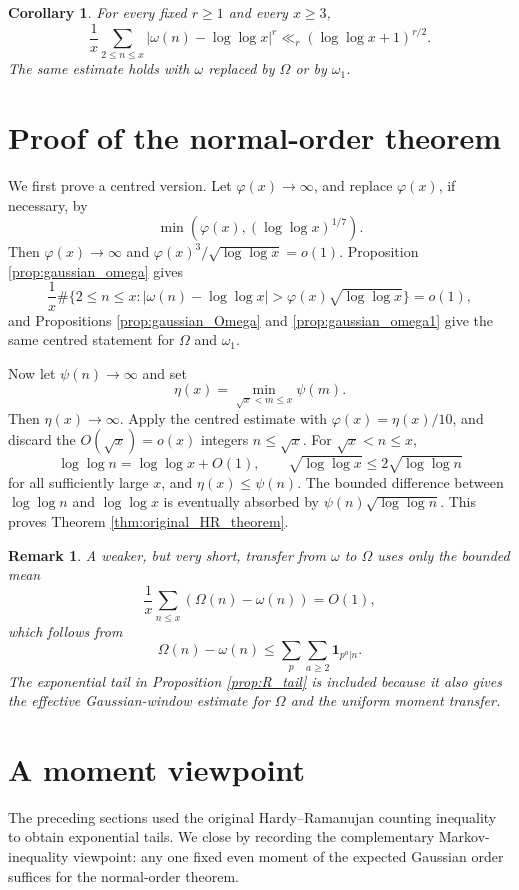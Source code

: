 \documentclass[12pt,a4paper,reqno]{amsart}
\theoremstyle{plain}
\newtheorem{crllry}[thrm]{Corollary}
\newtheorem*{rmk}{Remark}
\numberwithin{sblmm}{thrm}
\numberwithin{equation}{section}
\renewcommand{\phi}{\varphi}
\begin{document}
\begin{crllry}\label{cor:fixed_central_moments}
    For every fixed $r\ge 1$ and every $x\ge 3$,
    \begin{equation}\label{eqn:fixed_central_moments}
        \frac{1}{x}\sum_{2\le n\le x}|\omega(n)-\log\log x|^r\ll_r(\log\log x+1)^{r/2}.
    \end{equation}
    The same estimate holds with $\omega$ replaced by $\Omega$ or by $\omega_1$.
\end{crllry}

\section{Proof of the normal-order theorem}
We first prove a centred version. Let $\phi(x)\to\infty$, and replace $\phi(x)$, if necessary, by
$$\min(\phi(x),(\log\log x)^{1/7}).$$
Then $\phi(x)\to\infty$ and $\phi(x)^3/\sqrt{\log\log x}=o(1)$. Proposition \ref{prop:gaussian_omega} gives
$$\frac{1}{x}\#\{2\le n\le x:|\omega(n)-\log\log x|>\phi(x)\sqrt{\log\log x}\}=o(1),$$
and Propositions \ref{prop:gaussian_Omega} and \ref{prop:gaussian_omega1} give the same centred statement for $\Omega$ and $\omega_1$.

Now let $\psi(n)\to\infty$ and set
$$\eta(x)=\min_{\sqrt{x}<m\le x}\psi(m).$$
Then $\eta(x)\to\infty$. Apply the centred estimate with $\phi(x)=\eta(x)/10$, and discard the $O(\sqrt{x})=o(x)$ integers $n\le\sqrt{x}$. For $\sqrt{x}<n\le x$,
$$\log\log n=\log\log x+O(1),\qquad \sqrt{\log\log x}\le 2\sqrt{\log\log n}$$
for all sufficiently large $x$, and $\eta(x)\le\psi(n)$. The bounded difference between $\log\log n$ and $\log\log x$ is eventually absorbed by $\psi(n)\sqrt{\log\log n}$. This proves Theorem \ref{thm:original_HR_theorem}.

\begin{rmk}
    A weaker, but very short, transfer from $\omega$ to $\Omega$ uses only the bounded mean
    $$\frac{1}{x}\sum_{n\le x}(\Omega(n)-\omega(n))=O(1),$$
    which follows from
    $$\Omega(n)-\omega(n)\le\sum_p\sum_{a\ge 2}\mathbf{1}_{p^a|n}.$$
    The exponential tail in Proposition \ref{prop:R_tail} is included because it also gives the effective Gaussian-window estimate for $\Omega$ and the uniform moment transfer.
\end{rmk}

\section{A moment viewpoint}
The preceding sections used the original Hardy--Ramanujan counting inequality to obtain exponential tails. We close by recording the complementary Markov-inequality viewpoint: any one fixed even moment of the expected Gaussian order suffices for the normal-order theorem.
\end{document}
